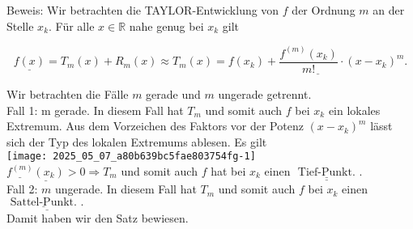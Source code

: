 \documentclass[10pt]{article}
\begin{document}
Beweis: Wir betrachten die TAYLOR-Entwicklung von $f$ der Ordnung $m$ an der Stelle $x_{k}$. Für alle $x \in \mathbb{R}$ nahe genug bei $x_{k}$ gilt


\begin{equation*}
\underline{f(x)}=T_{m}(x)+R_{m}(x) \approx T_{m}(x)=\underline{f\left(x_{k}\right)+\frac{f^{(m)}\left(x_{k}\right)}{m!} \cdot\left(x-x_{k}\right)^{m} .} \tag{4.26}
\end{equation*}


Wir betrachten die Fälle $m$ gerade und $m$ ungerade getrennt.\\
Fall 1: m gerade. In diesem Fall hat $T_{m}$ und somit auch $f$ bei $x_{k}$ ein lokales Extremum. Aus dem Vorzeichen des Faktors vor der Potenz $\left(x-x_{k}\right)^{m}$ lässt sich der Typ des lokalen Extremums ablesen. Es gilt\\
\texttt{[image: 2025\_05\_07\_a80b639bc5fae803754fg-1]}\\
$\underline{\underline{f^{(m)}}\left(x_{k}\right)>0} \Rightarrow T_{m}$ und somit auch $f$ hat bei $x_{k}$ einen $\underline{\underline{\text { Tief-Punkt. }}}$.\\
Fall 2: $m$ ungerade. In diesem Fall hat $T_{m}$ und somit auch $f$ bei $x_{k}$ einen $\underline{\underline{\text { Sattel-Punkt. }} \text {. }}$\\
Damit haben wir den Satz bewiesen.
\end{document}
